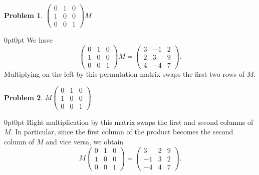 \documentclass[12pt]{article}
\newenvironment{answer}
    {\begin{adjustwidth}{0pt}{0pt}}
    {\end{adjustwidth}}
\newtheorem{problem}{Problem}
\theoremstyle{remark}  %
\begin{document}
\setcounter{problem}{0}
\begin{problem}
$
\begin{pmatrix}
0 & 1 & 0 \\
1 & 0 & 0 \\
0 & 0 & 1
\end{pmatrix} M
$
\end{problem}
\begin{answer}
We have
\[
\begin{pmatrix}
0 & 1 & 0 \\
1 & 0 & 0 \\
0 & 0 & 1
\end{pmatrix} M
=
\begin{pmatrix}
3 & -1 & 2 \\
2 & 3 & 9 \\
4 & -4 & 7
\end{pmatrix}.
\]
Multiplying on the left by this permutation matrix swaps the first two rows of \(M\).
\end{answer}

\begin{problem}
$
M
\begin{pmatrix}
0 & 1 & 0 \\
1 & 0 & 0 \\
0 & 0 & 1
\end{pmatrix}
$
\end{problem}
\begin{answer}
Right multiplication by this matrix swaps the first and second columns of \(M\). In particular, since the first column of the product becomes the second column of \(M\) and vice versa, we obtain
\[
M \begin{pmatrix}
0 & 1 & 0 \\
1 & 0 & 0 \\
0 & 0 & 1
\end{pmatrix}
=
\begin{pmatrix}
3 & 2 & 9 \\
-1 & 3 & 2 \\
-4 & 4 & 7
\end{pmatrix}.
\]
\end{answer}
\end{document}
